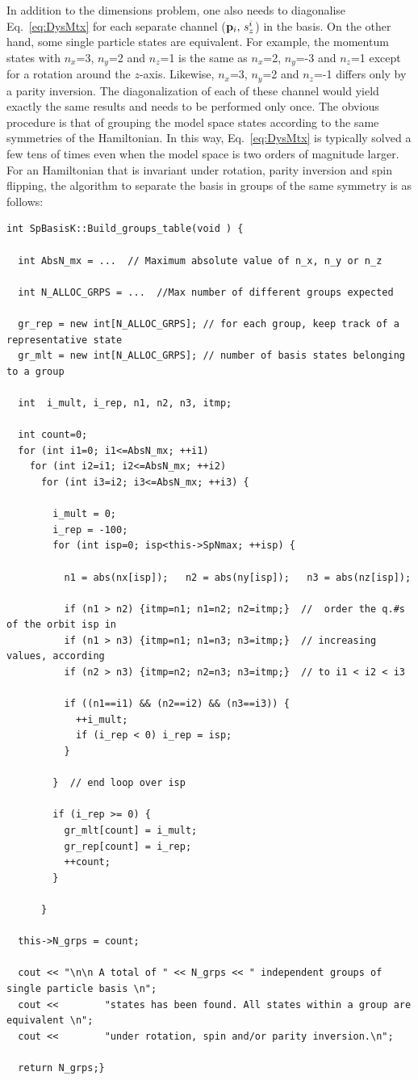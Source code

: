 In addition to the dimensions problem, one also needs to diagonalise Eq.~\eqref{eq:DysMtx} for each separate channel (${\bf p}_i, \, s_z^i$) in the basis.
On the other hand, some single particle states are equivalent. For example, the momentum states with $n_x$=3, $n_y$=2 and $n_z$=1 is the same
as $n_x$=2, $n_y$=-3 and $n_z$=1 except for a rotation around the $z$-axis. Likewise, $n_x$=3, $n_y$=2 and $n_z$=-1 differs only by a parity inversion.
The diagonalization of each of these channel would yield exactly the same results and needs to be performed only once.  The obvious procedure is that of grouping the model space states according to the same symmetries of the Hamiltonian. In this way, Eq.~\eqref{eq:DysMtx} is typically solved a few tens of times even when the model space is two orders of magnitude larger. 
%
For an Hamiltonian that is invariant under rotation, parity inversion and spin flipping, the algorithm to separate the basis in groups of the same symmetry is as follows:
\lstset{language=c++}
\begin{lstlisting}
int SpBasisK::Build_groups_table(void ) {
  
  int AbsN_mx = ...  // Maximum absolute value of n_x, n_y or n_z
  
  int N_ALLOC_GRPS = ...  //Max number of different groups expected
  
  gr_rep = new int[N_ALLOC_GRPS]; // for each group, keep track of a representative state
  gr_mlt = new int[N_ALLOC_GRPS]; // number of basis states belonging to a group
  
  int  i_mult, i_rep, n1, n2, n3, itmp;
  
  int count=0;
  for (int i1=0; i1<=AbsN_mx; ++i1)
    for (int i2=i1; i2<=AbsN_mx; ++i2)
      for (int i3=i2; i3<=AbsN_mx; ++i3) {
        
        i_mult = 0;
        i_rep = -100;
        for (int isp=0; isp<this->SpNmax; ++isp) {
          
          n1 = abs(nx[isp]);   n2 = abs(ny[isp]);   n3 = abs(nz[isp]);
          
          if (n1 > n2) {itmp=n1; n1=n2; n2=itmp;}  //  order the q.#s of the orbit isp in
          if (n1 > n3) {itmp=n1; n1=n3; n3=itmp;}  // increasing values, according 
          if (n2 > n3) {itmp=n2; n2=n3; n3=itmp;}  // to i1 < i2 < i3
          
          if ((n1==i1) && (n2==i2) && (n3==i3)) {
            ++i_mult;
            if (i_rep < 0) i_rep = isp;
          }
          
        }  // end loop over isp
        
        if (i_rep >= 0) {
          gr_mlt[count] = i_mult;
          gr_rep[count] = i_rep;
          ++count;
        }
        
      }
  
  this->N_grps = count;
  
  cout << "\n\n A total of " << N_grps << " independent groups of single particle basis \n";
  cout <<        "states has been found. All states within a group are equivalent \n";
  cout <<        "under rotation, spin and/or parity inversion.\n";
  
  return N_grps;}
\end{lstlisting}
